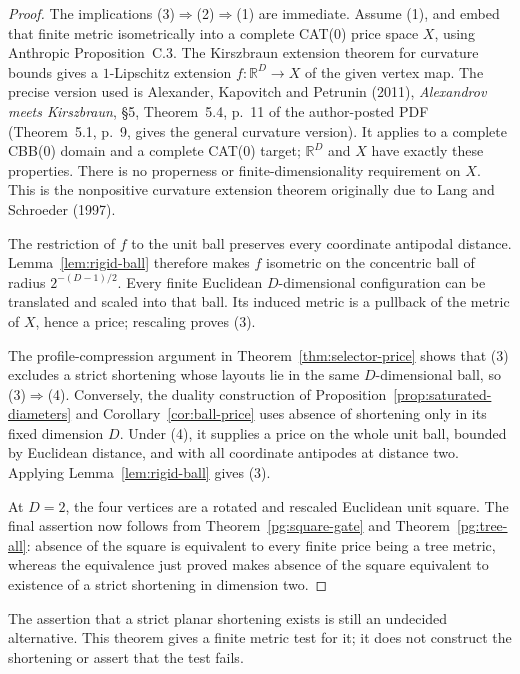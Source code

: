 \begin{proof}
The implications (3)$\Rightarrow$(2)$\Rightarrow$(1) are immediate.
Assume (1), and embed that finite metric isometrically into a complete
CAT(0) price space $X$, using Anthropic Proposition~C.3.
The Kirszbraun extension theorem for curvature bounds gives a
$1$-Lipschitz extension $f:\mathbb R^D\to X$ of the given vertex map.
The precise version used is Alexander, Kapovitch and Petrunin (2011),
\emph{Alexandrov meets Kirszbraun}, \S5, Theorem~5.4, p.~11 of the
author-posted PDF (Theorem~5.1, p.~9, gives the general curvature version).
It applies to a complete CBB(0) domain and a complete CAT(0) target;
$\mathbb R^D$ and $X$ have exactly these properties. There is no properness
or finite-dimensionality requirement on $X$. This is the nonpositive
curvature extension theorem originally due to Lang and Schroeder (1997).

The restriction of $f$ to the unit ball preserves every coordinate
antipodal distance. Lemma~\ref{lem:rigid-ball} therefore makes $f$
isometric on the concentric ball of radius $2^{-(D-1)/2}$. Every finite
Euclidean $D$-dimensional configuration can be translated and scaled
into that ball. Its induced metric is a pullback of the metric of $X$,
hence a price; rescaling proves (3).

The profile-compression argument in Theorem~\ref{thm:selector-price}
shows that (3) excludes a strict shortening whose layouts lie in the
same $D$-dimensional ball, so (3)$\Rightarrow$(4). Conversely, the
duality construction of Proposition~\ref{prop:saturated-diameters} and
Corollary~\ref{cor:ball-price} uses absence of shortening only in its
fixed dimension $D$. Under (4), it supplies a price on the whole unit
ball, bounded by Euclidean distance, and with all coordinate antipodes
at distance two. Applying Lemma~\ref{lem:rigid-ball} gives (3).

At $D=2$, the four vertices are a rotated and rescaled Euclidean unit
square. The final assertion now follows from
Theorem~\ref{pg:square-gate} and Theorem~\ref{pg:tree-all}: absence of
the square is equivalent to every finite price being a tree metric,
whereas the equivalence just proved makes absence of the square
equivalent to existence of a strict shortening in dimension two.
\end{proof}

The assertion that a strict planar shortening exists is still an
undecided alternative. This theorem gives a finite metric test for it;
it does not construct the shortening or assert that the test fails.

